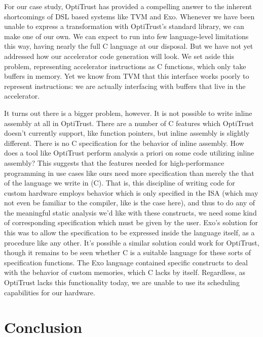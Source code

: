 \documentclass[acmsmall, nonacm=true]{acmart}
\begin{document}
For our case study, OptiTrust has provided a compelling answer to the inherent shortcomings of DSL based systems like TVM and Exo. Whenever we have been unable to express a transformation with OptiTrust's standard library, we can make one of our own. We can expect to run into few language-level limitations this way, having nearly the full C language at our disposal. But we have not yet addressed how our accelerator code generation will look. We set aside this problem, representing accelerator instructions as C functions, which only take buffers in memory. Yet we know from TVM that this interface works poorly to represent instructions: we are actually interfacing with buffers that live in the accelerator. 

It turns out there is a bigger problem, however. It is not possible to write inline assembly at all in OptiTrust. There are a number of C features which OptiTrust doesn't currently support, like function pointers, but inline assembly is slightly different. There is no C specification for the behavior of inline assembly. How does a tool like OptiTrust perform analysis a priori on some code utilizing inline assembly? This suggests that the features needed for high-performance programming in use cases like ours need more specification than merely the that of the language we write in (C). That is, this discipline of writing code for custom hardware employs behavior which is only specified in the ISA (which may not even be familiar to the compiler, like is the case here), and thus to do any of the meaningful static analysis we'd like with these constructs, we need some kind of corresponding specification which must be given by the user. Exo's solution for this was to allow the specification to be expressed inside the language itself, as a procedure like any other. It's possible a similar solution could work for OptiTrust, though it remains to be seen whether C is a suitable language for these sorts of specification functions. The Exo language contained specific constructs to deal with the behavior of custom memories, which C lacks by itself.  Regardless, as OptiTrust lacks this functionality today, we are unable to use its scheduling capabilities for our hardware.

\section{Conclusion}
\end{document}

